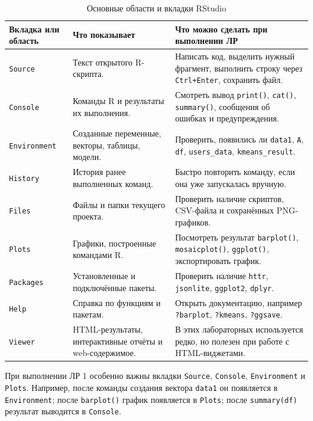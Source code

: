 \documentclass[14pt,a4paper]{extarticle}
\begin{document}
\begin{table}[H]
\caption{Основные области и вкладки RStudio}
\begin{tabularx}{\textwidth}{|l|Y|Y|}
\hline
\textbf{Вкладка или область} & \textbf{Что показывает} & \textbf{Что можно сделать при выполнении ЛР} \\
\hline
\texttt{Source} & Текст открытого R-скрипта. & Написать код, выделить нужный фрагмент, выполнить строку через \texttt{Ctrl+Enter}, сохранить файл. \\
\hline
\texttt{Console} & Команды R и результаты их выполнения. & Смотреть вывод \texttt{print()}, \texttt{cat()}, \texttt{summary()}, сообщения об ошибках и предупреждения. \\
\hline
\texttt{Environment} & Созданные переменные, векторы, таблицы, модели. & Проверить, появились ли \texttt{data1}, \texttt{A}, \texttt{df}, \texttt{users\_data}, \texttt{kmeans\_result}. \\
\hline
\texttt{History} & История ранее выполненных команд. & Быстро повторить команду, если она уже запускалась вручную. \\
\hline
\texttt{Files} & Файлы и папки текущего проекта. & Проверить наличие скриптов, CSV-файла и сохранённых PNG-графиков. \\
\hline
\texttt{Plots} & Графики, построенные командами R. & Посмотреть результат \texttt{barplot()}, \texttt{mosaicplot()}, \texttt{ggplot()}, экспортировать график. \\
\hline
\texttt{Packages} & Установленные и подключённые пакеты. & Проверить наличие \texttt{httr}, \texttt{jsonlite}, \texttt{ggplot2}, \texttt{dplyr}. \\
\hline
\texttt{Help} & Справка по функциям и пакетам. & Открыть документацию, например \texttt{?barplot}, \texttt{?kmeans}, \texttt{?ggsave}. \\
\hline
\texttt{Viewer} & HTML-результаты, интерактивные отчёты и web-содержимое. & В этих лабораторных используется редко, но полезен при работе с HTML-виджетами. \\
\hline
\end{tabularx}
\end{table}

При выполнении ЛР 1 особенно важны вкладки \texttt{Source}, \texttt{Console}, \texttt{Environment} и \texttt{Plots}. Например, после команды создания вектора \texttt{data1} он появляется в \texttt{Environment}; после \texttt{barplot()} график появляется в \texttt{Plots}; после \texttt{summary(df)} результат выводится в \texttt{Console}.
\end{document}
